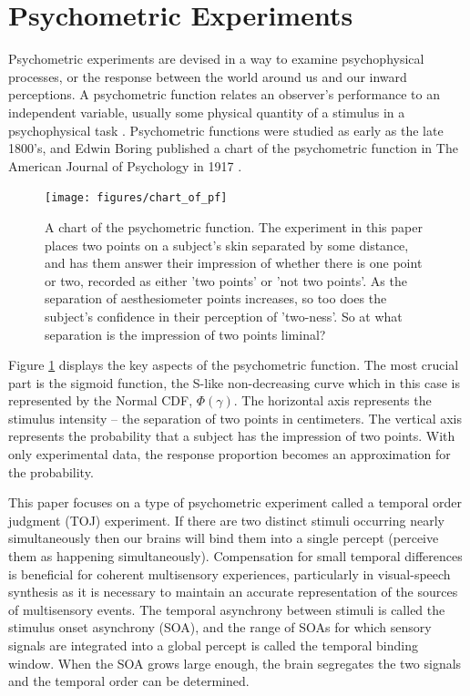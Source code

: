 \documentclass[11pt, oneside, openany]{scrbook}
\begin{document}
\hypertarget{psycho-experiments}{%
\section{Psychometric Experiments}\label{psycho-experiments}}

Psychometric experiments are devised in a way to examine psychophysical processes, or the response between the world around us and our inward perceptions. A psychometric function relates an observer's performance to an independent variable, usually some physical quantity of a stimulus in a psychophysical task \citep{wichmann2001a}. Psychometric functions were studied as early as the late 1800's, and Edwin Boring published a chart of the psychometric function in The American Journal of Psychology in 1917 \citep{boring1917chart}.

\begin{figure}

{\centering \texttt{[image: figures/chart\_of\_pf]} 

}

\caption{A chart of the psychometric function. The experiment in this paper places two points on a subject's skin separated by some distance, and has them answer their impression of whether there is one point or two, recorded as either 'two points' or 'not two points'. As the separation of aesthesiometer points increases, so too does the subject's confidence in their perception of 'two-ness'. So at what separation is the impression of two points liminal?}\label{fig:ch020-chart-of-pf}
\end{figure}

Figure \ref{fig:ch020-chart-of-pf} displays the key aspects of the psychometric function. The most crucial part is the sigmoid function, the S-like non-decreasing curve which in this case is represented by the Normal CDF, \(\Phi(\gamma)\). The horizontal axis represents the stimulus intensity -- the separation of two points in centimeters. The vertical axis represents the probability that a subject has the impression of two points. With only experimental data, the response proportion becomes an approximation for the probability.

This paper focuses on a type of psychometric experiment called a temporal order judgment (TOJ) experiment. If there are two distinct stimuli occurring nearly simultaneously then our brains will bind them into a single percept (perceive them as happening simultaneously). Compensation for small temporal differences is beneficial for coherent multisensory experiences, particularly in visual-speech synthesis as it is necessary to maintain an accurate representation of the sources of multisensory events. The temporal asynchrony between stimuli is called the stimulus onset asynchrony (SOA), and the range of SOAs for which sensory signals are integrated into a global percept is called the temporal binding window. When the SOA grows large enough, the brain segregates the two signals and the temporal order can be determined.
\end{document}
